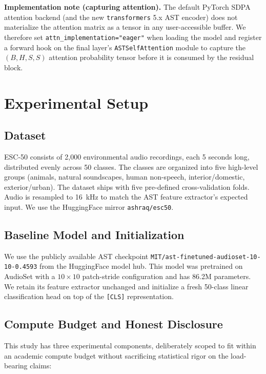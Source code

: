 \documentclass[conference]{IEEEtran}
\begin{document}
\textbf{Implementation note (capturing attention).} The default PyTorch SDPA attention backend (and the new \texttt{transformers} 5.x AST encoder) does not materialize the attention matrix as a tensor in any user-accessible buffer. We therefore set \texttt{attn\_implementation="eager"} when loading the model and register a forward hook on the final layer's \texttt{ASTSelfAttention} module to capture the $(B, H, S, S)$ attention probability tensor before it is consumed by the residual block.

\section{Experimental Setup}

\subsection{Dataset}

ESC-50 \cite{piczak2015esc} consists of 2{,}000 environmental audio recordings, each 5 seconds long, distributed evenly across 50 classes. The classes are organized into five high-level groups (animals, natural soundscapes, human non-speech, interior/domestic, exterior/urban). The dataset ships with five pre-defined cross-validation folds. Audio is resampled to 16~kHz to match the AST feature extractor's expected input. We use the HuggingFace mirror \texttt{ashraq/esc50}.

\subsection{Baseline Model and Initialization}

We use the publicly available AST checkpoint \texttt{MIT/ast-finetuned-audioset-10-10-0.4593} from the HuggingFace model hub. This model was pretrained on AudioSet \cite{gemmeke2017audioset} with a $10 \times 10$ patch-stride configuration and has 86.2M parameters. We retain its feature extractor unchanged and initialize a fresh 50-class linear classification head on top of the \texttt{[CLS]} representation.

\subsection{Compute Budget and Honest Disclosure}
\label{sec:compute}

This study has three experimental components, deliberately scoped to fit within an academic compute budget without sacrificing statistical rigor on the load-bearing claims:
\end{document}
